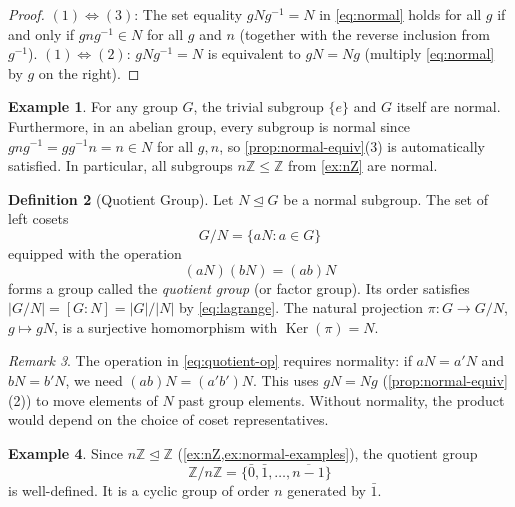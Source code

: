 \documentclass[12pt,a4paper]{article}
\theoremstyle{definition}
\newtheorem{definition}{Definition}[section]
\newtheorem{example}[definition]{Example}
\theoremstyle{plain}
\theoremstyle{remark}
\newtheorem{remark}[definition]{Remark}
\newcommand{\Z}{\mathbb{Z}}
\newcommand{\Ker}{\operatorname{Ker}}
\newcommand{\normal}{\trianglelefteq}
\begin{document}
\begin{proof}
$(1) \Leftrightarrow (3)$: The set equality $gNg^{-1} = N$ in \cref{eq:normal}
holds for all $g$ if and only if $gng^{-1} \in N$ for all $g$ and $n$
(together with the reverse inclusion from $g^{-1}$).
$(1) \Leftrightarrow (2)$: $gNg^{-1} = N$ is equivalent to $gN = Ng$
(multiply \cref{eq:normal} by $g$ on the right).
\end{proof}

\begin{example}\label{ex:normal-examples}
For any group $G$, the trivial subgroup $\{e\}$
and $G$ itself are normal.
Furthermore, in an abelian group, every subgroup is normal
since $gng^{-1} = gg^{-1}n = n \in N$ for all $g, n$, so
\cref{prop:normal-equiv}(3) is automatically satisfied.
In particular, all subgroups $n\Z \leq \Z$ from \cref{ex:nZ} are normal.
\end{example}

\begin{definition}[Quotient Group]\label{def:quotient}
Let $N \normal G$ be a normal subgroup. The set of left cosets
\begin{equation}\label{eq:quotient-set}
    G/N = \{aN : a \in G\}
\end{equation}
equipped with the operation
\begin{equation}\label{eq:quotient-op}
    (aN)(bN) = (ab)N
\end{equation}
forms a group called the \emph{quotient group} (or factor group).
Its order satisfies $|G/N| = [G : N] = |G|/|N|$ by \cref{eq:lagrange}.
The natural projection
$\pi \colon G \to G/N$, $g \mapsto gN$, is a surjective homomorphism
with $\Ker(\pi) = N$.
\end{definition}

\begin{remark}\label{rem:well-defined}
The operation in \cref{eq:quotient-op} requires normality:
if $aN = a'N$ and $bN = b'N$, we need $(ab)N = (a'b')N$.
This uses $gN = Ng$ (\cref{prop:normal-equiv}(2)) to move elements of $N$
past group elements. Without normality, the product would depend on
the choice of coset representatives.
\end{remark}

\begin{example}\label{ex:Z-mod-n}
Since $n\Z \normal \Z$ (\cref{ex:nZ,ex:normal-examples}), the quotient group
\[
    \Z / n\Z = \{\bar{0}, \bar{1}, \dots, \overline{n-1}\}
\]
is well-defined. It is a cyclic group of order $n$
generated by $\bar{1}$.
\end{example}
\end{document}
